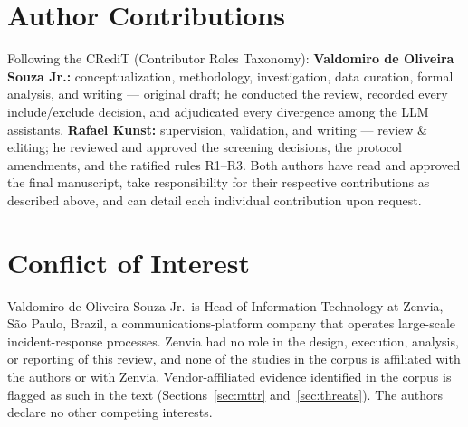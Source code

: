 \documentclass{ieeeaccess}
\begin{document}
\section*{Author Contributions}

Following the CRediT (Contributor Roles Taxonomy):
\textbf{Valdomiro de Oliveira Souza Jr.:} conceptualization,
methodology, investigation, data curation, formal analysis, and
writing --- original draft; he conducted the review, recorded every
include/exclude decision, and adjudicated every divergence among the
LLM assistants. \textbf{Rafael Kunst:} supervision, validation, and
writing --- review \& editing; he reviewed and approved the screening
decisions, the protocol amendments, and the ratified rules R1--R3.
Both authors have read and approved the final manuscript, take
responsibility for their respective contributions as described above,
and can detail each individual contribution upon request.

\section*{Conflict of Interest}

Valdomiro de Oliveira Souza Jr.\ is Head of Information Technology at
Zenvia, S\~ao Paulo, Brazil, a communications-platform company that
operates large-scale incident-response processes. Zenvia had no role in
the design, execution, analysis, or reporting of this review, and none
of the studies in the corpus is affiliated with the authors or with
Zenvia. Vendor-affiliated evidence identified in the corpus is flagged
as such in the text (Sections~\ref{sec:mttr}
and~\ref{sec:threats}). The authors declare no other competing
interests.

\end{document}
